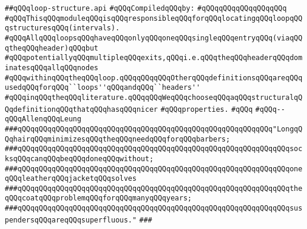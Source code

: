 \label{src/lib/graph/loop-structure.api}
\verb|##qQQqloop-structure.api|\newline
\newline
\verb|#qQQqCompiledqQQqby:|\newline
\verb|#qQQqqQQqqQQqqQQqqQQq|\newline
\newline
\newline
\newline
\newline
\verb|#qQQqThisqQQqmoduleqQQqisqQQqresponsibleqQQqforqQQqlocatingqQQqloopqQQqstructuresqQQq(intervals).|\newline
\verb|#qQQqAllqQQqloopsqQQqhaveqQQqonlyqQQqoneqQQqsingleqQQqentryqQQq(viaqQQqtheqQQqheader)qQQqbut|\newline
\verb|#qQQqpotentiallyqQQqmultipleqQQqexits,qQQqi.e.qQQqtheqQQqheaderqQQqdominatesqQQqallqQQqnodes|\newline
\verb|#qQQqwithinqQQqtheqQQqloop.qQQqqQQqqQQqOtherqQQqdefinitionsqQQqareqQQqusedqQQqforqQQq``loops''qQQqandqQQq``headers''|\newline
\verb|#qQQqinqQQqtheqQQqliterature.qQQqqQQqWeqQQqchooseqQQqaqQQqstructuralqQQqdefinitionqQQqthatqQQqhasqQQqnicer|\newline
\verb|#qQQqproperties.|\newline
\verb|#qQQq|\newline
\verb|#qQQq--qQQqAllenqQQqLeung|\newline
\newline
\newline
\newline
\verb|###qQQqqQQqqQQqqQQqqQQqqQQqqQQqqQQqqQQqqQQqqQQqqQQqqQQqqQQqqQQq"LongqQQqhairqQQqminimizesqQQqtheqQQqneedqQQqforqQQqbarbers;|\newline
\verb|###qQQqqQQqqQQqqQQqqQQqqQQqqQQqqQQqqQQqqQQqqQQqqQQqqQQqqQQqqQQqqQQqsocksqQQqcanqQQqbeqQQqdoneqQQqwithout;|\newline
\verb|###qQQqqQQqqQQqqQQqqQQqqQQqqQQqqQQqqQQqqQQqqQQqqQQqqQQqqQQqqQQqqQQqoneqQQqleatherqQQqjacketqQQqsolves|\newline
\verb|###qQQqqQQqqQQqqQQqqQQqqQQqqQQqqQQqqQQqqQQqqQQqqQQqqQQqqQQqqQQqqQQqtheqQQqcoatqQQqproblemqQQqforqQQqmanyqQQqyears;|\newline
\verb|###qQQqqQQqqQQqqQQqqQQqqQQqqQQqqQQqqQQqqQQqqQQqqQQqqQQqqQQqqQQqqQQqsuspendersqQQqareqQQqsuperfluous."|\newline
\verb|###|\newline
